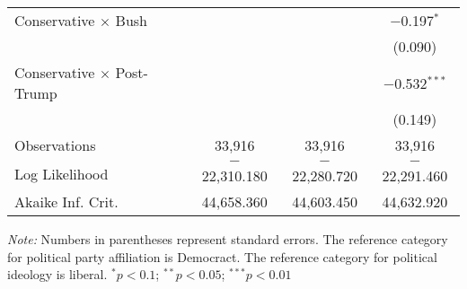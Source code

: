 \begin{ThreePartTable}
\begin{tabularx}{\textwidth}{Xccc}
  Conservative $\times$ Bush &  &  & $-$0.197$^{*}$ \\ 
  &  &  & (0.090) \\ 
  Conservative $\times$ Post-Trump &  &  & $-$0.532$^{***}$ \\ 
  &  &  & (0.149) \\ 
 \midrule  
Observations & 33,916 & 33,916 & 33,916 \\ 
Log Likelihood & $-$22,310.180 & $-$22,280.720 & $-$22,291.460 \\ 
Akaike Inf. Crit. & 44,658.360 & 44,603.450 & 44,632.920 \\ 
\end{tabularx} 
{\it Note:} Numbers in parentheses represent standard errors. The reference category for political party affiliation is Democract. The reference category for political ideology is liberal. \newline $^{*}p<0.1$; $^{**}p<0.05$; $^{***}p<0.01$
\bigskip 
\end{ThreePartTable} 
